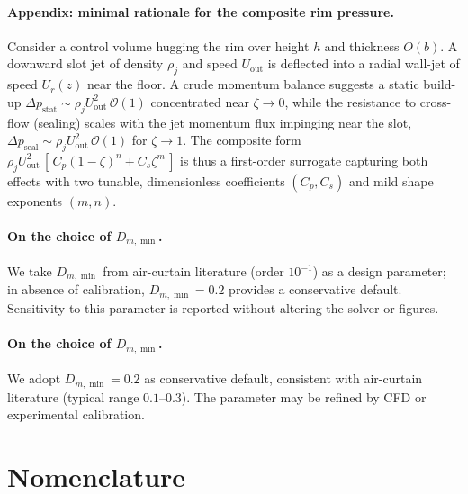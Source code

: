 \documentclass[11pt,a4paper]{article}
\begin{document}
\paragraph{Appendix: minimal rationale for the composite rim pressure.}
Consider a control volume hugging the rim over height $h$ and thickness $O(b)$.
A downward slot jet of density $\rho_j$ and speed $U_{\mathrm{out}}$ is deflected
into a radial wall-jet of speed $U_r(z)$ near the floor. A crude momentum balance
suggests a static build-up $\Delta p_{\mathrm{stat}}\sim \rho_j U_{\mathrm{out}}^2
\,\mathcal{O}(1)$ concentrated near $\zeta\!\to\!0$, while the resistance to
cross-flow (sealing) scales with the jet momentum flux impinging near the slot,
$\Delta p_{\mathrm{seal}}\sim \rho_j U_{\mathrm{out}}^2\,\mathcal{O}(1)$ for
$\zeta\!\to\!1$. The composite form
$\rho_j U_{\mathrm{out}}^2\,[\,C_p(1-\zeta)^n + C_s \zeta^m\,]$ is thus a
first-order surrogate capturing both effects with two tunable, dimensionless
coefficients $(C_p,C_s)$ and mild shape exponents $(m,n)$.

\paragraph{On the choice of $D_{m,\min}$.}
We take $D_{m,\min}$ from air-curtain literature (order $10^{-1}$) as a design parameter; in absence of calibration, $D_{m,\min}=0.2$ provides a conservative default.
Sensitivity to this parameter is reported without altering the solver or figures.

\paragraph{On the choice of $D_{m,\min}$.}
We adopt $D_{m,\min}=0.2$ as conservative default, consistent with air-curtain literature (typical range $0.1$--$0.3$). The parameter may be refined by CFD or experimental calibration.


\section{Nomenclature}
\label{sec:nomenclature}
\end{document}
